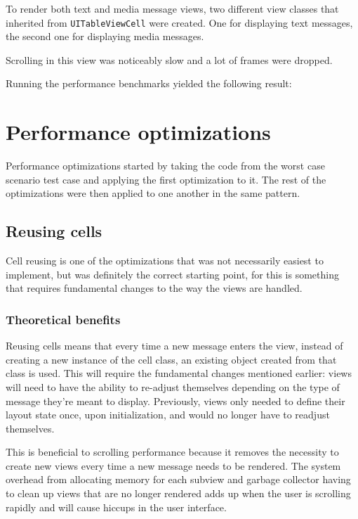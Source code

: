 \documentclass[a4paper,12pt]{article}
\begin{document}
To render both text and media message views, two different view classes that inherited from \texttt{UITableViewCell} were created. One for displaying text messages, the second one for displaying media messages.

Scrolling in this view was noticeably slow and a lot of frames were dropped.

Running the performance benchmarks yielded the following result:

\newpage
\section{Performance optimizations}
Performance optimizations started by taking the code from the worst case scenario test case and applying the first optimization to it. The rest of the optimizations were then applied to one another in the same pattern.

\subsection{Reusing cells}
Cell reusing is one of the optimizations that was not necessarily easiest to implement, but was definitely the correct starting point, for this is something that requires fundamental changes to the way the views are handled.

\subsubsection{Theoretical benefits}
Reusing cells means that every time a new message enters the view, instead of creating a new instance of the cell class, an existing object created from that class is used. This will require the fundamental changes mentioned earlier: views will need to have the ability to re-adjust themselves depending on the type of message they're meant to display. Previously, views only needed to define their layout state once, upon initialization, and would no longer have to readjust themselves.

This is beneficial to scrolling performance because it removes the necessity to create new views every time a new message needs to be rendered. The system overhead from allocating memory for each subview and garbage collector having to clean up views that are no longer rendered adds up when the user is scrolling rapidly and will cause hiccups in the user interface.
\end{document}
